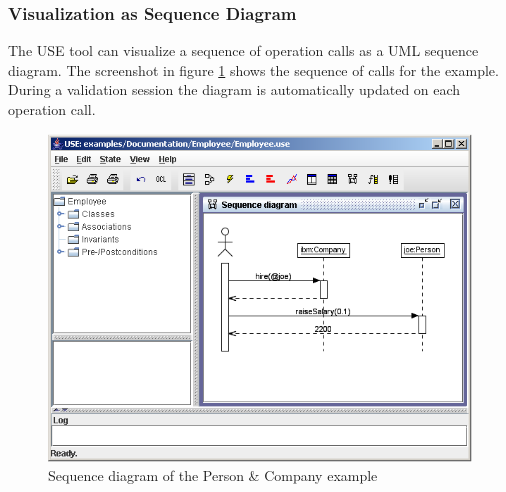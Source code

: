 \documentclass[a4paper,titlepage,oneside,final]{scrreprt} %
\begin{document}
\subsubsection{Visualization as Sequence Diagram}
The USE tool can visualize a sequence of operation calls as a UML sequence diagram.
The screenshot in figure \ref{fig:EmployeeSequence} shows the sequence of calls for the example.
During a validation session the diagram is automatically updated on each operation call.
\begin{figure}[ht]
\centering
\includegraphics[scale=0.7]{Screenshots/GUI/EmployeeSequence.png}
\caption{Sequence diagram of the Person \& Company example}
\label{fig:EmployeeSequence}
\end{figure}
\end{document}
